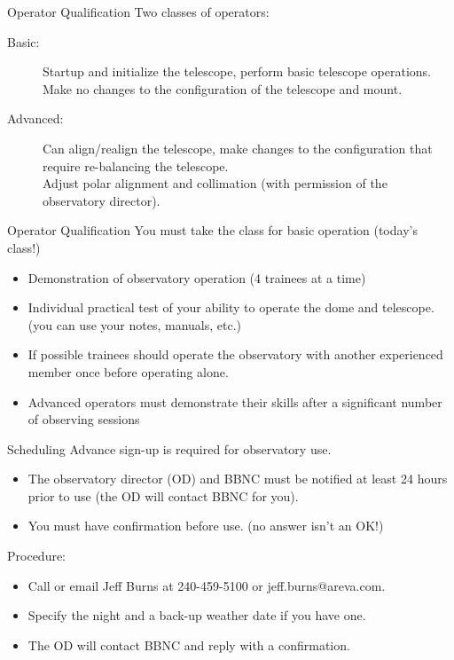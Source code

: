 
\begin{frame}{Operator Qualification}
  \Large
  Two classes of operators:
  \begin{description}
    \item[Basic:] Startup and initialize the telescope, perform basic telescope operations.
     Make no changes to the configuration of the telescope and mount.
    \item[Advanced:] Can align/realign the telescope, make changes to the configuration that require
     re-balancing the telescope. \\[1ex]
     Adjust polar alignment and collimation (with permission of the observatory director).
  \end{description}
\end{frame}


\begin{frame}{Operator Qualification}
  \Large
  You must take the class for basic operation (today's class!)
  \begin{itemize}
    \item Demonstration of observatory operation (4 trainees at a time)
    \item Individual practical test of your ability to operate the dome and telescope.
     (you can use your notes, manuals, etc.)
    \item If possible trainees should operate the observatory with another experienced
      member once before operating alone.
    \item Advanced operators must demonstrate their skills after a significant number of observing sessions
  \end{itemize}
\end{frame}


\begin{frame}{Scheduling}
  \Large
  Advance sign-up is required for observatory use.
  \begin{itemize}
    \item The observatory director (OD) and BBNC must be notified at least 24 hours prior
    to use (the OD will contact BBNC for you).
    \item You must have confirmation before use. (no answer isn't an OK!)
  \end{itemize}

  Procedure:
  \begin{itemize}
    \item Call or email Jeff Burns at 240-459-5100 or jeff.burns@areva.com.
    \item Specify the night and a back-up weather date if you have one.
    \item The OD will contact BBNC and reply with a confirmation.
  \end{itemize}
\end{frame}

